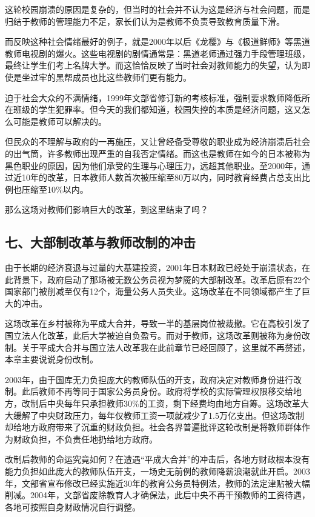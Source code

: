 这轮校园崩溃的原因是复杂的，但当时的社会并不认为这是经济与社会问题，而是归结于教师的管理能力不足，家长们认为是教师不负责导致教育质量下滑。

而反映这种社会情绪最好的例子，就是2000年以后《龙樱》与《极道鲜师》等黑道教师电视剧的爆火。这些电视剧的剧情通常是：黑道老师通过强力手段管理班级，最终让学生们考上名牌大学。而这恰恰反映了当时社会对教师能力的失望，认为即使是坐过牢的黑帮成员也比这些教师们更有能力。

迫于社会大众的不满情绪，1999年文部省修订新的考核标准，强制要求教师降低所在班级的学生犯罪率。但今天的我们都知道，校园失控的本质是经济问题，这又怎么可能是教师可以解决的。

但民众的不理解与政府的一再施压，又让曾经备受尊敬的职业成为经济崩溃后社会的出气筒，许多教师出现严重的自我否定情绪。而这也是教师在如今的日本被称为黑色职业的原因，因为他们承受的生理与心理压力，远超其他职业。至2000年，通过近10年的改革，日本教师人数首次被压缩至80万以内，同时教育经费占总支出比例也压缩至10\%以内。

那么这场对教师们影响巨大的改革，到这里结束了吗？

\subsection{七、大部制改革与教师改制的冲击}

由于长期的经济衰退与过量的大基建投资，2001年日本财政已经处于崩溃状态，在此背景下，政府启动了那场被无数公务员视为梦魇的大部制改革。改革后原有22个国家部门被削减至仅有12个，海量公务人员失业。这场改革在不同领域都产生了巨大的冲击。

这场改革在乡村被称为平成大合并，导致一半的基层岗位被裁撤。它在高校引发了国立法人化改革，此后大学被迫自负盈亏。而对于教师，这场改革则被称为身份改制。关于平成大合并与国立法人改革我在此前章节已经回顾了，这里就不再赘述，本章主要说说身份改制。

2003年，由于国库无力负担庞大的教师队伍的开支，政府决定对教师身份进行改制。此后教师不再等同于国家公务员身份。政府将学校的实际管理权限移交给地方，改制后中央每年只承担教师30\%的工资，剩下经费均由地方自筹。这场改革大大缓解了中央财政压力，每年仅教师工资一项就减少了1.5万亿支出。但这场改制却给地方政府带来了沉重的财政负担。社会各界普遍批评这轮改制是将教师群体作为财政负担，不负责任地扔给地方政府。

改制后教师的命运究竟如何？在遭遇“平成大合并”的冲击后，各地方财政根本没有能力负担如此庞大的教师队伍开支，一场史无前例的教师降薪浪潮就此开启。2003年，文部省宣布修改已经实施近30年的教育公务员特例法，教师的法定津贴被大幅削减。2004年，文部省废除教育人才确保法，此后中央不再干预教师的工资待遇，各地可按照自身财政情况自行调整。

